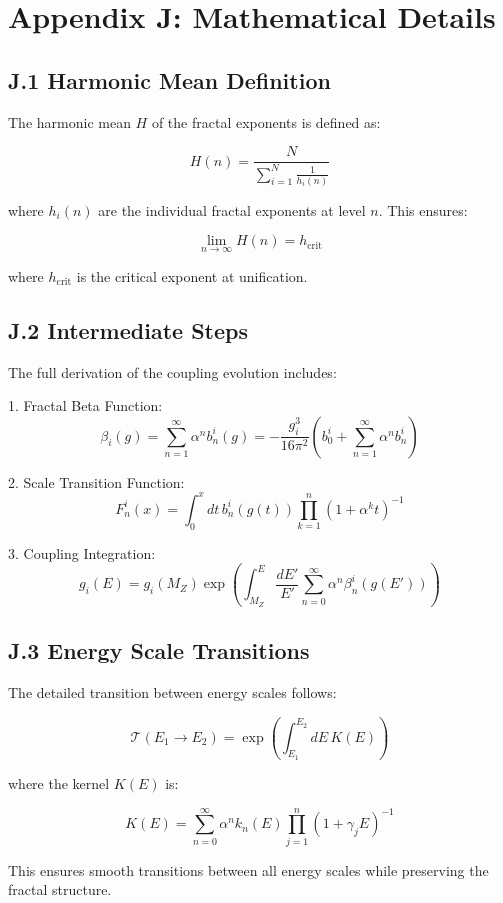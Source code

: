 \section*{Appendix J: Mathematical Details}
\label{app:math_details}

\subsection*{J.1 Harmonic Mean Definition}
\label{subsec:harmonic_mean}

The harmonic mean $H$ of the fractal exponents is defined as:

\[
H(n) = \frac{N}{\sum_{i=1}^N \frac{1}{h_i(n)}}
\]

where $h_i(n)$ are the individual fractal exponents at level $n$. This ensures:

\[
\lim_{n \to \infty} H(n) = h_{\text{crit}}
\]

where $h_{\text{crit}}$ is the critical exponent at unification.

\subsection*{J.2 Intermediate Steps}
\label{subsec:intermediate_steps}

The full derivation of the coupling evolution includes:

1. Fractal Beta Function:
   \[
   \beta_i(g) = \sum_{n=1}^{\infty} \alpha^n b_n^i(g) = -\frac{g_i^3}{16\pi^2}\left(b_0^i + \sum_{n=1}^{\infty} \alpha^n b_n^i\right)
   \]

2. Scale Transition Function:
   \[
   F_n^i(x) = \int_0^x dt\, b_n^i(g(t))\prod_{k=1}^n (1 + \alpha^k t)^{-1}
   \]

3. Coupling Integration:
   \[
   g_i(E) = g_i(M_Z)\exp\left(\int_{M_Z}^E \frac{dE'}{E'}\sum_{n=0}^{\infty} \alpha^n \beta_n^i(g(E'))\right)
   \]

\subsection*{J.3 Energy Scale Transitions}
\label{subsec:energy_transitions_math}

The detailed transition between energy scales follows:

\[
\mathcal{T}(E_1 \to E_2) = \exp\left(\int_{E_1}^{E_2} dE\, K(E)\right)
\]

where the kernel $K(E)$ is:

\[
K(E) = \sum_{n=0}^{\infty} \alpha^n k_n(E)\prod_{j=1}^n (1 + \gamma_j E)^{-1}
\]

This ensures smooth transitions between all energy scales while preserving the fractal structure. 
